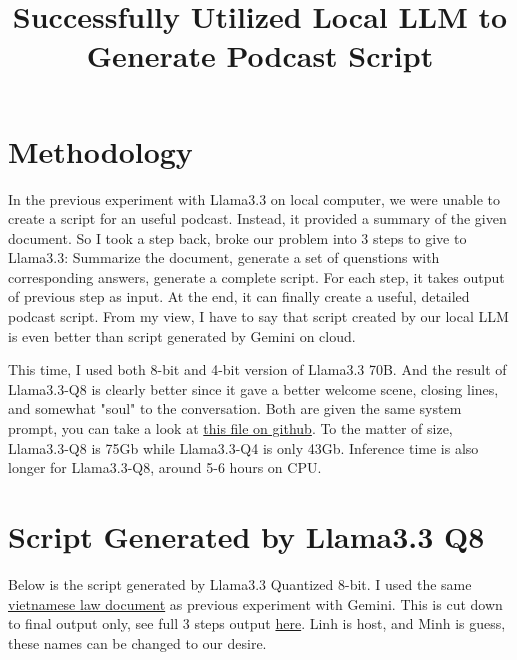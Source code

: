 \documentclass[12pt]{article}
\title{Successfully Utilized Local LLM to Generate Podcast Script}
\author{}
\date{}
\begin{document}
\maketitle
\section{Methodology}
In the previous experiment with Llama3.3 on local computer, we were unable to create a script for an useful podcast. Instead, it provided a summary of the given document. 
So I took a step back, broke our problem into 3 steps to give to Llama3.3: Summarize the document, generate a set of quenstions with corresponding answers, 
generate a complete script. For each step, it takes output of previous step as input. At the end, it can finally create a useful, detailed podcast script.
From my view, I have to say that script created by our local LLM is even better than script generated by Gemini on cloud. 

This time, I used both 8-bit and 4-bit version of Llama3.3 70B. And the result of Llama3.3-Q8 is clearly better since it gave a better welcome scene, closing lines, 
and somewhat "soul" to the conversation. Both are given the same system prompt, you can take a look at \href{https://github.com/Minhsuperfragile/llm_repurpose/blob/main/podcast_creation/default_prompts.py}{this file on github}.
To the matter of size, Llama3.3-Q8 is 75Gb while Llama3.3-Q4 is only 43Gb. Inference time is also longer for Llama3.3-Q8, around 5-6 hours on CPU.

\section{Script Generated by Llama3.3 Q8}
Below is the script generated by Llama3.3 Quantized 8-bit. I used the same \href{https://thuvienphapluat.vn/van-ban/Bo-may-hanh-chinh/Quyet-dinh-17-2021-QD-UBND-vi-tri-chuc-nang-Chi-cuc-Trong-trot-va-Bao-ve-thuc-vat-tinh-Lao-Cai-481420.aspx}{vietnamese law document} as previous experiment with Gemini.
This is cut down to final output only, see full 3 steps output \href{https://github.com/Minhsuperfragile/llm_repurpose/blob/main/podcast_creation/results/llama3.3_Q8_response.txt}{here}. Linh is host, and Minh is guess, these names can be changed to our desire.
\end{document}
